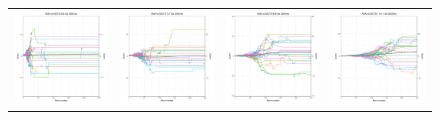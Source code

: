 \begin{figure}
\begin{tabular}{cccc}
\hspace{-0.5cm}\includegraphics[width = 1.55in]{images/Visualizations/ANNvsMCTS/2000ms5x5.png} &
\hspace{-0.5cm}\includegraphics[width = 1.55in]{images/Visualizations/ANNvsMCTS/2000ms7x7.png} &
\hspace{-0.5cm}\includegraphics[width = 1.55in]{images/Visualizations/ANNvsMCTS/2000ms9x9.png} &
\hspace{-0.5cm}\includegraphics[width = 1.55in]{images/Visualizations/ANNvsMCTS/2000ms11x11.png} \\


\end{tabular}
\end{figure}
